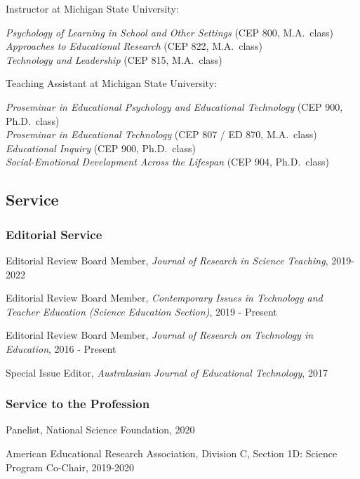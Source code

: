 \documentclass[14,]{article}
\begin{document}
Instructor at Michigan State University:

\emph{Psychology of Learning in School and Other Settings} (CEP 800,
M.A.~class)\\
\emph{Approaches to Educational Research} (CEP 822, M.A.~class)\\
\emph{Technology and Leadership} (CEP 815, M.A.~class)

Teaching Assistant at Michigan State University:

\emph{Proseminar in Educational Psychology and Educational Technology}
(CEP 900, Ph.D.~class)\\
\emph{Proseminar in Educational Technology} (CEP 807 / ED 870,
M.A.~class)\\
\emph{Educational Inquiry} (CEP 900, Ph.D.~class)\\
\emph{Social-Emotional Development Across the Lifespan} (CEP 904,
Ph.D.~class)

\hypertarget{service}{%
\subsection{Service}\label{service}}

\hypertarget{editorial-service}{%
\subsubsection{Editorial Service}\label{editorial-service}}

Editorial Review Board Member, \emph{Journal of Research in Science
Teaching}, 2019-2022

Editorial Review Board Member, \emph{Contemporary Issues in Technology
and Teacher Education (Science Education Section)}, 2019 - Present

Editorial Review Board Member, \emph{Journal of Research on Technology
in Education}, 2016 - Present

Special Issue Editor, \emph{Australasian Journal of Educational
Technology}, 2017

\hypertarget{service-to-the-profession}{%
\subsubsection{Service to the
Profession}\label{service-to-the-profession}}

Panelist, National Science Foundation, 2020

American Educational Research Association, Division C, Section 1D:
Science Program Co-Chair, 2019-2020
\end{document}

